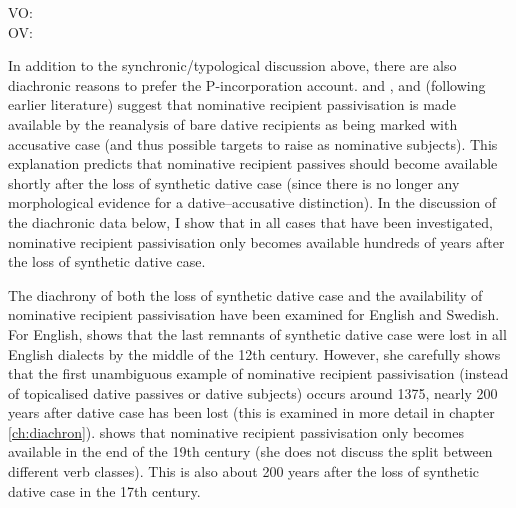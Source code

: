 \begin{exe}
	 VO:\\
	\ex OV:\\

\end{exe}


In addition to the synchronic/typological discussion above, there are also diachronic reasons to prefer the P-incorporation account. \cite{Falk.1997} and \cite{Allen.1999}, and \cite{Platzack.2005} (following earlier literature) suggest that nominative recipient passivisation is made available by the reanalysis of bare dative recipients as being marked with accusative case (and thus possible targets to raise as nominative subjects). This explanation predicts that nominative recipient passives should become available shortly after the loss of synthetic dative case (since there is no longer any morphological evidence for a dative--accusative distinction). In the discussion of the diachronic data below, I show that in all cases that have been investigated, nominative recipient passivisation only becomes available hundreds of years after the loss of synthetic dative case.

The diachrony of both the loss of synthetic dative case and the availability of nominative recipient passivisation have been examined for English and Swedish. For English, \cite{Allen.1999} shows that the last remnants of synthetic dative case were lost in all English dialects by the middle of the 12th century. However, she carefully shows that the first unambiguous example of nominative recipient passivisation (instead of topicalised dative passives or dative subjects) occurs around 1375, nearly 200 years after dative case has been lost (this is examined in more detail in chapter \ref{ch:diachron}). \cite{Falk.1997} shows that nominative recipient passivisation only becomes available in the end of the 19th century (she does not discuss the split between different verb classes). This is also about 200 years after the loss of synthetic dative case in the 17th century. 

